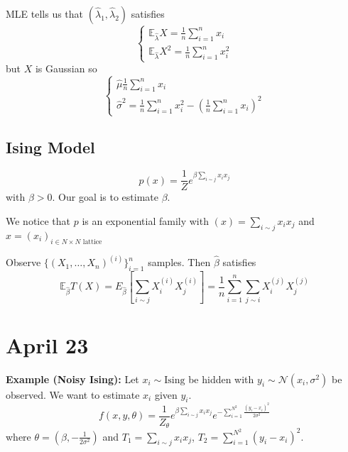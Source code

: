 \documentclass[12pt]{report}
\renewcommand{\hat}[1]{\widehat{#1}}
\newcommand{\E}{\mathbb{E}}
\newcommand{\Nc}{\mathcal{N}}
\newcommand*{\tbf}[1]{\ifmmode\mathbf{#1}\else\textbf{#1}\fi}
\begin{document}
MLE tells us that $(\hat \lambda_1, \hat \lambda_2)$ satisfies
\[\begin{cases}
		\E_{\hat \lambda} X = \frac{1}{n} \sum_{i=1}^n x_i \\
		\E_{\hat \lambda} X^2 = \frac{1}{n} \sum_{i=1}^n x_i^2
	\end{cases}\]
but $X$ is Gaussian so
\[\begin{cases}
		\hat \mu \frac{1}{n} \sum_{i=1}^n x_i \\
		\hat\sigma^2 = \frac{1}{n} \sum_{i=1}^n x_i^2 - \left(\frac{1}{n} \sum_{i=1}^n x_i\right)^2
	\end{cases}\]

\subsection{Ising Model}

\begin{center}
\end{center}

\[p(x) = \frac{1}{Z} e^{\beta \sum_{i \sim j} x_i x_j}\]
with $\beta > 0$. Our goal is to estimate $\beta$.

We notice that $p$ is an exponential family with $(x) = \sum_{i \sim j} x_i x_j$ and $x = (x_i)_{i \in N \times N \text{ lattice}}$

Observe $\{(X_1, \dots, X_n)^{(i)}\}_{i=1}^n$ samples. Then $\hat \beta$ satisfies
\[\E_{\hat \beta} T(X) = E_{\hat \beta} \left[\sum_{i \sim j} X_i^{(i)} X_j^{(i)}\right] = \frac{1}{n} \sum_{i=1}^n \sum_{j \sim i} X_i^{(j)} X_j^{(j)}\]

\section{April 23}
\tbf{Example (Noisy Ising):} Let $x_i \sim \text{Ising}$ be hidden with $y_i \sim \Nc(x_i, \sigma^2)$ be observed. We want to estimate $x_i$ given $y_i$.
\[f(x, y, \theta) = \frac{1}{Z_{\theta}} e^{\beta \sum_{i \sim j} x_i x_j} e^{-\sum_{i=1}^{N^2} \frac{(y_i - x_i)^2}{2\sigma^2}}\]
where $\theta = (\beta, -\frac{1}{2\sigma^2})$ and $T_1 = \sum_{i \sim j} x_i x_j$, $T_2 = \sum_{i=1}^{N^2} (y_i - x_i)^2$.
\end{document}

